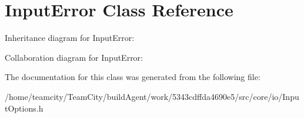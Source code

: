 \hypertarget{classInputError}{}\section{Input\+Error Class Reference}
\label{classInputError}


Inheritance diagram for Input\+Error\+:


Collaboration diagram for Input\+Error\+:


The documentation for this class was generated from the following file\+:\begin{DoxyCompactItemize}
\item 
/home/teamcity/\+Team\+City/build\+Agent/work/5343cdffda4690e5/src/core/io/Input\+Options.\+h\end{DoxyCompactItemize}
